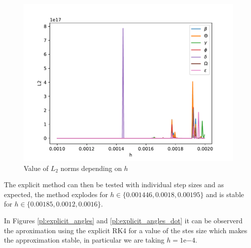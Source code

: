 \documentclass{report}
\begin{document}
\begin{figure}[h]
\begin{minipage}[t]{0.45\textwidth}
\centering
\includegraphics[width=\textwidth]{../Plots/RK4_Proj2/L2_norm_different_k.pdf}
\caption{Value of $L_2$ norms depending on $h$}
\label{pl:L2_norm_explicit}
\end{minipage}
\end{figure}


The explicit method can then be tested with individual step sizes and as expected, the method explodes for $h \in \{0.001446, 0.0018, 0.00195\}$ and is stable for $h \in \{0.00185, 0.0012, 0.0016\}$.

In Figures \ref{pl:explicit_angles} and \ref{pl:explicit_angles_dot} it can be observerd the aproximation using the explicit RK4 for a value of the stes size which makes the approximation stable, in particular we are taking $h=1\mathrm{e}{-4}$.
\end{document}
